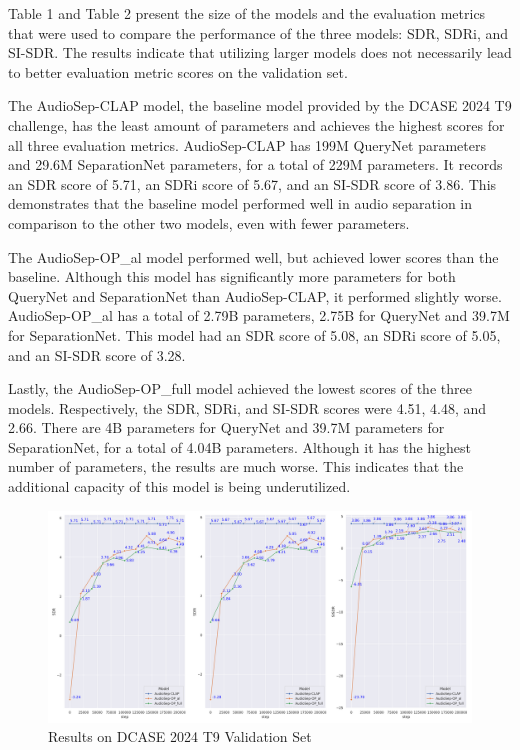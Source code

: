 \documentclass[11pt]{article}
\begin{document}
Table 1 and Table 2 present the size of the models and the evaluation metrics that were used to compare the performance of the three models: SDR, SDRi, and SI-SDR. The results indicate that utilizing larger models does not necessarily lead to better evaluation metric scores on the validation set.  

The AudioSep-CLAP model, the baseline model provided by the DCASE 2024 T9 challenge, has the least amount of parameters and achieves the highest scores for all three evaluation metrics. AudioSep-CLAP has 199M QueryNet parameters and 29.6M SeparationNet parameters, for a total of 229M parameters. It records an SDR score of 5.71, an SDRi score of 5.67, and an SI-SDR score of 3.86. This demonstrates that the baseline model performed well in audio separation in comparison to the other two models, even with fewer parameters. 

The AudioSep-OP\_al model performed well, but achieved lower scores than the baseline. Although this model has significantly more parameters for both QueryNet and SeparationNet than AudioSep-CLAP, it performed slightly worse. AudioSep-OP\_al has a total of 2.79B parameters, 2.75B for QueryNet and 39.7M for SeparationNet. This model had an SDR score of 5.08, an SDRi score of 5.05, and an SI-SDR score of 3.28. 

Lastly, the AudioSep-OP\_full model achieved the lowest scores of the three models. Respectively, the SDR, SDRi, and SI-SDR scores were 4.51, 4.48, and 2.66. There are 4B parameters for QueryNet and 39.7M parameters for SeparationNet, for a total of 4.04B parameters. Although it has the highest number of parameters, the results are much worse. This indicates that the additional capacity of this model is being underutilized.

\begin{figure}[!htbp]
  \includegraphics[width=\textwidth]{plots/validation_plots.png}
  \caption{Results on DCASE 2024 T9 Validation Set}
  \label{fig:validation_results}
\end{figure}
\end{document}
